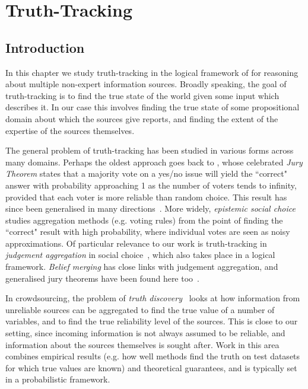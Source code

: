 \chapter{Truth-Tracking}

\section{Introduction}

In this chapter we study truth-tracking in the logical framework of
\textcite{singleton_booth_22_preprint} for reasoning about multiple non-expert
information sources. Broadly speaking, the goal of truth-tracking is to find
the true state of the world given some input which describes it. In our case
this involves finding the true state of some propositional domain about which
the sources give reports, and finding the extent of the expertise of the
sources themselves.

The general problem of truth-tracking has been studied in various forms across
many domains. Perhaps the oldest approach goes back to \textcite{condorcet}, whose
celebrated \emph{Jury Theorem} states that a majority vote on a yes/no issue
will yield the ``correct" answer with probability approaching 1 as the number
of voters tends to infinity, provided that each voter is more reliable than
random choice. This result has since been generalised in many
directions~\textcite{grofman1983thirteen}. More widely, \emph{epistemic social
choice}~\cite{elkind2016rationalizations} studies aggregation methods (e.g.
voting rules) from the point of finding the ``correct" result with high
probability, where individual votes are seen as noisy approximations. Of
particular relevance to our work is truth-tracking in \emph{judgement
aggregation} in social
choice~\cite{hartmann_judgment_2012,TerzopoulouEndrissSAGT2019}, which also
takes place in a logical framework. \emph{Belief merging} has close links with
judgement aggregation, and generalised jury theorems have been found here
too~\cite{everaere_epistemic_2010}.

In crowdsourcing, the problem of \emph{truth discovery}~\cite{li_survey_2016}
looks at how information from unreliable sources can be aggregated to find the
true value of a number of variables, and to find the true reliability level of
the sources. This is close to our setting, since incoming information is not
always assumed to be reliable, and information about the sources themselves is
sought after. Work in this area combines empirical results (e.g. how well
methods find the truth on test datasets for which true values are known) and
theoretical guarantees, and is
typically set in a probabilistic framework.

